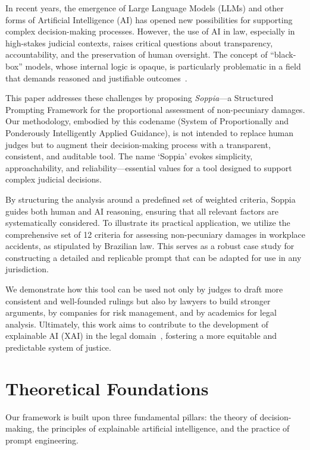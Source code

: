 \documentclass[11pt,a4paper]{article}
\begin{document}
In recent years, the emergence of Large Language Models (LLMs) and other forms of Artificial Intelligence (AI) has opened new possibilities for supporting complex decision-making processes. However, the use of AI in law, especially in high-stakes judicial contexts, raises critical questions about transparency, accountability, and the preservation of human oversight. The concept of ``black-box'' models, whose internal logic is opaque, is particularly problematic in a field that demands reasoned and justifiable outcomes~\cite{rudin2019stop}.

This paper addresses these challenges by proposing \textit{Soppia}---a Structured Prompting Framework for the proportional assessment of non-pecuniary damages. Our methodology, embodied by this codename (System of Proportionally and Ponderously Intelligently Applied Guidance), is not intended to replace human judges but to augment their decision-making process with a transparent, consistent, and auditable tool. The name `Soppia' evokes simplicity, approachability, and reliability---essential values for a tool designed to support complex judicial decisions.

By structuring the analysis around a predefined set of weighted criteria, Soppia guides both human and AI reasoning, ensuring that all relevant factors are systematically considered. To illustrate its practical application, we utilize the comprehensive set of 12 criteria for assessing non-pecuniary damages in workplace accidents, as stipulated by Brazilian law. This serves as a robust case study for constructing a detailed and replicable prompt that can be adapted for use in any jurisdiction.

We demonstrate how this tool can be used not only by judges to draft more consistent and well-founded rulings but also by lawyers to build stronger arguments, by companies for risk management, and by academics for legal analysis. Ultimately, this work aims to contribute to the development of explainable AI (XAI) in the legal domain~\cite{richmond2024explainable}, fostering a more equitable and predictable system of justice.

\section{Theoretical Foundations}

Our framework is built upon three fundamental pillars: the theory of decision-making, the principles of explainable artificial intelligence, and the practice of prompt engineering.
\end{document}

